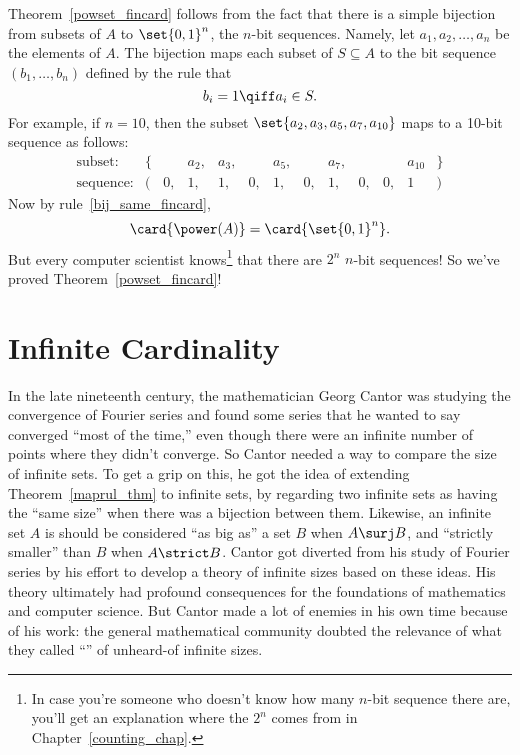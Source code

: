 Theorem~\ref{powset_fincard} follows from the fact that there is a
simple bijection from subsets of $A$ to $\set{0,1}^n$, the $n$-bit
sequences.  Namely, let $a_1, a_2, \dots, a_n$ be the elements of $A$.
The bijection maps each subset of $S \subseteq A$ to the bit sequence
$(b_1, \dots, b_n)$ defined by the rule that
\[
b_i = 1 \qiff a_i \in S.
\]
For example, if $n = 10$, then the subset $\set{a_2, a_3, a_5, a_7,
  a_{10}}$ maps to a 10-bit sequence as follows:
%
\[
\begin{array}{rrrrrrrrrrrrr}
\text{subset:} &
\{ &    & a_2, & a_3, &    & a_5, &   & a_7, &    &    & a_{10} & \} \\
\text{sequence:} &
(  & 0, &   1, &   1, & 0, &   1, & 0, &   1, & 0, & 0, &        1 & )
\end{array}
\]
%
Now by rule~\eqref{bij_same_fincard},
\[
\card{\power(A)} = \card{\set{0,1}^n}.
\]
But every computer scientist knows\footnote{In case you're
  someone who doesn't know how many $n$-bit sequence there are, you'll get
  an explanation where the $2^n$ comes from in Chapter~\ref{counting_chap}.}
that there are $2^n$ $n$-bit sequences!
So we've proved Theorem~\ref{powset_fincard}!

\section{Infinite Cardinality}\label{infinite_sec}

In the late nineteenth century, the mathematician Georg Cantor was
studying the convergence of Fourier series and found some series that he
wanted to say converged ``most of the time,'' even though there were an
infinite number of points where they didn't converge.  So Cantor needed a
way to compare the size of infinite sets.  To get a grip on this, he got
the idea of extending Theorem~\ref{maprul_thm} to infinite sets, by
regarding two infinite sets as having the ``same size'' when there was a
bijection between them.  Likewise, an infinite set $A$ is should be
considered ``as big as'' a set $B$ when $A \surj B$, and ``strictly
smaller'' than $B$ when $A \strict B$.  Cantor got diverted from his study
of Fourier series by his effort to develop a theory of infinite sizes
based on these ideas.  His theory ultimately had profound consequences for
the foundations of mathematics and computer science.  But Cantor made a
lot of enemies in his own time because of his work: the general
mathematical community doubted the relevance of what they called
``'' of unheard-of infinite sizes.

